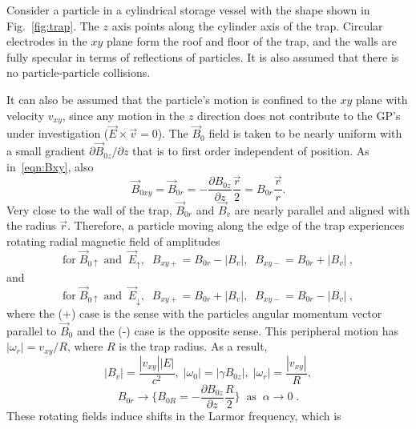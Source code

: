 Consider a particle in a cylindrical storage vessel with the shape
shown in Fig.~\ref{fig:trap}.  The $z$ axis points along the cylinder
axis of the trap.  Circular electrodes in the $xy$ plane form the roof
and floor of the trap, and the walls are fully specular in terms of
reflections of particles.  It is also assumed that there is no
particle-particle collisions.

It can also be assumed that the particle's motion is confined to the
$xy$ plane with velocity $v_{xy}$, since any motion in the $z$
direction does not contribute to the GP's under investigation
($\vec{E} \times \vec{v} = 0$). The $\vec{B}_0$ field is taken to be
nearly uniform with a small gradient $\partial\vec{B}_{0z}/\partial z$
that is to first order independent of position.  As in~\ref{eqn:Bxy},
also
%
\begin{equation}
\vec{B}_{0xy} = \vec{B}_{0r} = - \frac{\partial B_{0z}}{\partial z} \frac{\vec{r}}{2} = B_{0r} \frac{\vec{r}}{r} .
\end{equation}
%
Very close to the wall of the trap, $\vec{B}_{0r}$ and $\vec{B}_{v}$
are nearly parallel and aligned with the radius $\vec{r}$.  Therefore,
a particle moving along the edge of the trap experiences rotating
radial magnetic field of amplitudes
%
\begin{equation}
\textrm{for} \; \vec{B}_{0 \uparrow} \; \textrm{and} \;\; 
\vec{E}_{\uparrow}, \;\; B_{xy +} = B_{0r} - |B_{v}|, 
\;\; B_{xy -} = B_{0r} + |B_{v}| ~,
\end{equation}
and 
\begin{equation}
\textrm{for} \; \vec{B}_{0 \uparrow} \; \textrm{and} \;\; 
\vec{E}_{\downarrow}, \;\; B_{xy +} = B_{0r} + |B_{v}|, 
\;\; B_{xy -} = B_{0r} - |B_{v}| ~,
\end{equation}
%
where the (+) case is the sense with the particles angular momentum
vector parallel to $\vec{B}_0$ and the (-) case is the opposite sense.
This peripheral motion has $|\omega_r| = v_{xy}/R$, where $R$ is the
trap radius.  As a result,
\begin{equation}
\label{eqn:relations}
|B_v| = \frac{|v_{xy}||E|}{c^2}, \; |\omega_0| = |\gamma B_{0z}|, \; |\omega_r| = \frac{|v_{xy}|}{R},
\end{equation}
%
\begin{equation*}
B_{0r} \rightarrow \lbrace B_{0R} = - \frac{\partial B_{0z}}{\partial z} \frac{R}{2} \rbrace \;\; \textrm{as} \;\; \alpha \rightarrow 0 \; .
\end{equation*}
%
These rotating fields induce shifts in the Larmor frequency, which is
